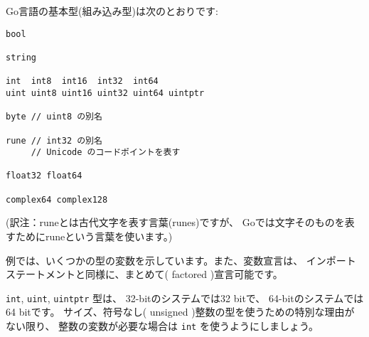 Go言語の基本型(組み込み型)は次のとおりです:

\begin{lstlisting}[numbers=none]
bool

string

int  int8  int16  int32  int64
uint uint8 uint16 uint32 uint64 uintptr

byte // uint8 の別名

rune // int32 の別名
     // Unicode のコードポイントを表す

float32 float64

complex64 complex128
\end{lstlisting}

(訳注：runeとは古代文字を表す言葉(runes)ですが、
Goでは文字そのものを表すためにruneという言葉を使います。)

例では、いくつかの型の変数を示しています。また、変数宣言は、
インポートステートメントと同様に、まとめて( factored )宣言可能です。

\texttt{int}, \texttt{uint}, \texttt{uintptr} 型は、
32-bitのシステムでは32 bitで、
64-bitのシステムでは64 bitです。 
サイズ、符号なし( unsigned )整数の型を使うための特別な理由がない限り、
整数の変数が必要な場合は \texttt{int} を使うようにしましょう。